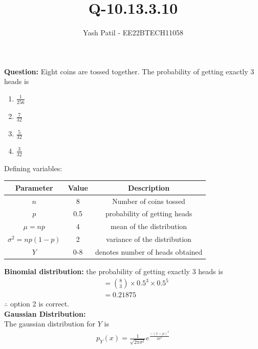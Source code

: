 \documentclass[journal,12pt,twocolumn]{IEEEtran}
\theoremstyle{remark}
\begin{document}



\vspace{3cm}

\title{
Q-10.13.3.10
}
\author{Yash Patil - EE22BTECH11058}

\maketitle
\textbf{Question:} Eight coins are tossed together. The probability of getting exactly 3 heads is
\begin{enumerate}
	\item $\frac{1}{256}$
	\item $\frac{7}{32}$
	\item $\frac{5}{32}$
	\item $\frac{3}{32}$
\end{enumerate}
\solution
Defining variables:
\begin{table}[H]
\def\arraystretch{1.2}
\begin{tabular}{|c|c|c|}
\hline
	\textbf{Parameter} &\textbf{Value} &\textbf{Description}\\ \hline
	$n$ &8 &Number of coins tossed\\ 
	\hline
	$p$ &0.5 & probability of getting heads\\ 
	\hline
	$\mu = np$ &4 & mean of the distribution\\ 
	\hline
	$\sigma^2 = np(1-p)$ &2 & variance of the distribution\\ 
	\hline
	$Y$ & 0-8 & denotes number of heads obtained\\
	\hline
\end{tabular}
\end{table}
%
\textbf{Binomial distribution:} 
the probability of getting exactly 3 heads is 
\begin{align}
	&= \binom{8}{3} \times 0.5^3\times 0.5^{5}\\
	&= 0.21875
\end{align}
$\therefore$ option 2 is correct.\\
\textbf{Gaussian Distribution:}\\
The gaussian distribution for $Y$ is
\begin{align}
	p_Y(x) = \frac{1}{\sqrt{2\pi\sigma^2}}e^{\frac{-(x-\mu)^2}{2\sigma^2}}\label{9.3.31}
\end{align}
\end{document}
